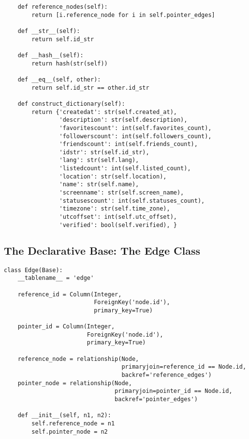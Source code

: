 \begin{lstlisting}
    def reference_nodes(self):
        return [i.reference_node for i in self.pointer_edges]

    def __str__(self):
        return self.id_str

    def __hash__(self):
        return hash(str(self))

    def __eq__(self, other):
        return self.id_str == other.id_str

    def construct_dictionary(self):
        return {'createdat': str(self.created_at),
                'description': str(self.description),
                'favoritescount': int(self.favorites_count),
                'followerscount': int(self.followers_count),
                'friendscount': int(self.friends_count),
                'idstr': str(self.id_str),
                'lang': str(self.lang),
                'listedcount': int(self.listed_count),
                'location': str(self.location),
                'name': str(self.name),
                'screenname': str(self.screen_name),
                'statusescount': int(self.statuses_count),
                'timezone': str(self.time_zone),
                'utcoffset': int(self.utc_offset),
                'verified': bool(self.verified), }
\end{lstlisting}

\subsection{The Declarative Base: The Edge Class}
\begin{lstlisting}
class Edge(Base):
    __tablename__ = 'edge'

    reference_id = Column(Integer,
                          ForeignKey('node.id'),
                          primary_key=True)

    pointer_id = Column(Integer,
                        ForeignKey('node.id'),
                        primary_key=True)

    reference_node = relationship(Node,
                                  primaryjoin=reference_id == Node.id,
                                  backref='reference_edges')
    pointer_node = relationship(Node,
                                primaryjoin=pointer_id == Node.id,
                                backref='pointer_edges')

    def __init__(self, n1, n2):
        self.reference_node = n1
        self.pointer_node = n2
\end{lstlisting}


